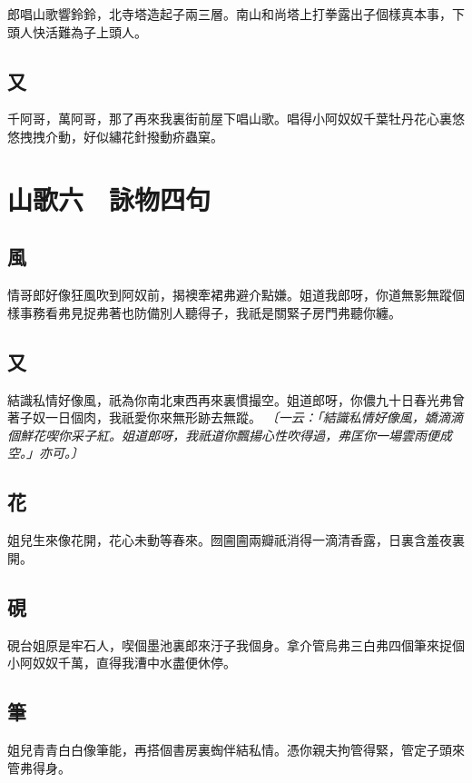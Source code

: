 郎唱山歌響鈴鈴，北寺塔造起子兩三層。南山和尚塔上打拳露出子個樣真本事，下頭人快活難為子上頭人。

\subsection*{又}

千阿哥，萬阿哥，那了再來我裏街前屋下唱山歌。唱得小阿奴奴千葉牡丹花心裏悠悠拽拽介動，好似繡花針撥動疥蟲窠。


\section*{山歌六　詠物四句}
\subsection*{風}

情哥郎好像狂風吹到阿奴前，揭襖牽裙弗避介點嫌。姐道我郎呀，你道無影無蹤個樣事務看弗見捉弗著也防備別人聽得子，我祇是關緊子房門弗聽你纏。

\subsection*{又}

結識私情好像風，祇為你南北東西再來裏慣撮空。姐道郎呀，你儂九十日春光弗曾著子奴一日個肉，我祇愛你來無形跡去無蹤。
\textit{〔一云：「結識私情好像風，嬌滴滴個鮮花喫你采子紅。姐道郎呀，我祇道你飄揚心性吹得過，弗匡你一場雲雨便成空。」亦可。〕}

\subsection*{花}

姐兒生來像花開，花心未動等春來。囫圇圇兩瓣祇消得一滴清香露，日裏含羞夜裏開。

\subsection*{硯}

硯台姐原是牢石人，喫個墨池裏郎來汙子我個身。拿介管烏弗三白弗四個筆來捉個小阿奴奴千萬，直得我漕中水盡便休停。

\subsection*{筆}

姐兒青青白白像筆能，再搭個書房裏蜪伴結私情。憑你親夫拘管得緊，管定子頭來管弗得身。

